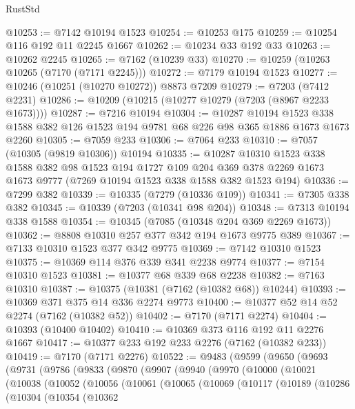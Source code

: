 \begin{lexlean}{RustStd}
\begin{coremodule}
@10253 := @7142 @10194 @1523
@10254 := @10253 @175
@10259 := @10254 @116 @192 @11 @2245 @1667
@10262 := @10234 @33 @192 @33
@10263 := @10262 @2245
@10265 := @7162 (@10239 @33)
@10270 := @10259 (@10263 @10265 (@7170 (@7171 @2245)))
@10272 := @7179 @10194 @1523
@10277 := @10246 (@10251 (@10270 @10272)) @8873 @7209
@10279 := @7203 (@7412 @2231)
@10286 := @10209 (@10215 (@10277 @10279 (@7203 (@8967 @2233 @1673))))
@10287 := @7216 @10194
@10304 := @10287
    @10194
    @1523
    @338
    @1588
    @382
    @126
    @1523
    @194
    @9781
    @68
    @226
    @98
    @365
    @1886
    @1673
    @1673
    @2260
@10305 := @7059 @233
@10306 := @7064 @233
@10310 := @7057 (@10305 (@9819 @10306)) @10194
@10335 := @10287
    @10310
    @1523
    @338
    @1588
    @382
    @98
    @1523
    @194
    @1727
    @109
    @204
    @369
    @378
    @2269
    @1673
    @1673
    @9777
    (@7269 @10194 @1523 @338 @1588 @382 @1523 @194)
@10336 := @7299 @382
@10339 := @10335 (@7279 (@10336 @109))
@10341 := @7305 @338 @382
@10345 := @10339 (@7203 (@10341 @98 @204))
@10348 := @7313 @10194 @338 @1588
@10354 := @10345 (@7085 (@10348 @204 @369 @2269 @1673))
@10362 := @8808 @10310 @257 @377 @342 @194 @1673 @9775 @389
@10367 := @7133 @10310 @1523 @377 @342 @9775
@10369 := @7142 @10310 @1523
@10375 := @10369 @114 @376 @339 @341 @2238 @9774
@10377 := @7154 @10310 @1523
@10381 := @10377 @68 @339 @68 @2238
@10382 := @7163 @10310
@10387 := @10375 (@10381 (@7162 (@10382 @68)) @10244)
@10393 := @10369 @371 @375 @14 @336 @2274 @9773
@10400 := @10377 @52 @14 @52 @2274 (@7162 (@10382 @52))
@10402 := @7170 (@7171 @2274)
@10404 := @10393 (@10400 @10402)
@10410 := @10369 @373 @116 @192 @11 @2276 @1667
@10417 := @10377 @233 @192 @233 @2276 (@7162 (@10382 @233))
@10419 := @7170 (@7171 @2276)
@10522 := @9483
    (@9599
      (@9650
        (@9693
          (@9731
            (@9786
              (@9833
                (@9870
                  (@9907
                    (@9940
                      (@9970
                        (@10000
                          (@10021
                            (@10038
                              (@10052
                                (@10056
                                  (@10061
                                    (@10065
                                      (@10069
                                        (@10117
                                          (@10189
                                            (@10286
                                              (@10304
                                                (@10354
                                                  (@10362

\end{coremodule}
\end{lexlean}
